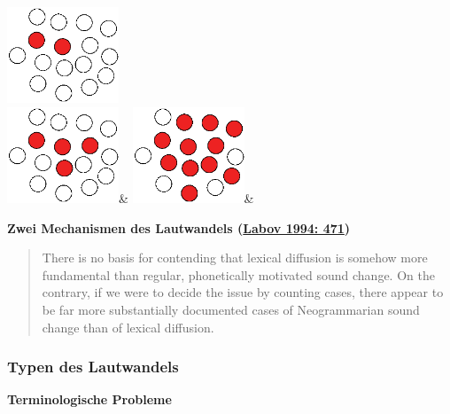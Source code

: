 \includegraphics[width=0.25\textwidth]{img/diffusion-2.png}\\
\includegraphics[width=0.25\textwidth]{img/diffusion-3.png}&
\includegraphics[width=0.25\textwidth]{img/diffusion-4.png}&
\\
\endtabular



\vspace{0.5cm}\par\noindent\textbf{Zwei Mechanismen des Lautwandels\vspace{0.5cm}
(\href{http://bibliography.lingpy.org?key=Labov1994}{Labov 1994: 471})}

\begin{quote}
There is no basis for contending that lexical diffusion is somehow more
fundamental than regular, phonetically motivated sound change. On the
contrary, if we were to decide the issue by counting cases, there appear
to be far more substantially documented cases of Neogrammarian sound
change than of lexical diffusion.
\end{quote}


\subsubsection{\texorpdfstring{{Typen des
Lautwandels}}{Typen des Lautwandels}}

\vspace{0.5cm}\par\noindent\textbf{Terminologische Probleme}\vspace{0.5cm}

